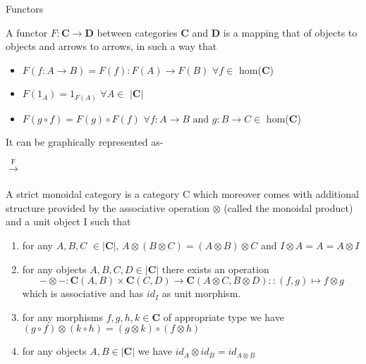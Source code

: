 \documentclass[11pt]{beamer}
\begin{document}
\begin{frame}{Functors}
\begin{definition}
A functor $F : \textbf{C} \rightarrow \textbf{D}$ between categories \textbf{C} and \textbf{D} is a mapping that of objects to objects and arrows to arrows, in such a way that
\begin{itemize}
    \item $F(f : A \rightarrow B) = F(f) : F(A) \rightarrow F(B)$  $\forall f \in$  hom(\textbf{C})
    \item $F(1_A) = 1_{F(A)}$ $\forall A\in $ \(|{\textbf{C}}|\)
    \item $F(g \circ f) = F(g) \circ F(f)$  $\forall f: A\rightarrow B\text{ and }g: B\rightarrow C \in$ hom(\textbf{C})
\end{itemize}
\end{definition}
It can be graphically represented as-\\
$\xrightarrow[]{\text{F}}$
\end{frame}
\begin{frame}{}
    \begin{definition}A strict monoidal category is a category C which
moreover comes with additional structure provided by the associative operation $\otimes$ (called the monoidal product) and a unit
object I such that
\begin{enumerate}
    \item for any $A, B, C$ $\in |\textbf{C}|$, $A\otimes(B\otimes C)=(A\otimes B)\otimes C$ and $I\otimes A=A=A\otimes I$
    \item for any objects $A,B,C,D \in |\textbf{C}|$ there exists an operation
    $$-\otimes-:\textbf{C}(A,B)\times\textbf{C}(C,D)\rightarrow \textbf{C}(A\otimes C,B\otimes D)::(f,g)\mapsto f\otimes g$$
    which is associative and has $\textit{id}_I$ as unit morphism.
    \item for any morphisms $f, g, h, k \in \textbf{C}$ of appropriate type we have $(g\circ f)\otimes (k\circ h)=(g\otimes k)\circ (f\otimes h) $
    \item for any objects $A, B \in |\textbf{C}|$ we have $\textit{id}_A\otimes\textit{id}_B=\textit{id}_{A\otimes B} $
\end{enumerate}
\end{definition}
\end{frame}
\end{document}
